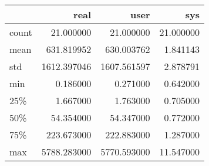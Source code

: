 \begin{tabular}{lrrr}
\toprule
{} &         real &         user &        sys \\
\midrule
count &    21.000000 &    21.000000 &  21.000000 \\
mean  &   631.819952 &   630.003762 &   1.841143 \\
std   &  1612.397046 &  1607.561597 &   2.878791 \\
min   &     0.186000 &     0.271000 &   0.642000 \\
25\%   &     1.667000 &     1.763000 &   0.705000 \\
50\%   &    54.354000 &    54.347000 &   0.772000 \\
75\%   &   223.673000 &   222.883000 &   1.287000 \\
max   &  5788.283000 &  5770.593000 &  11.547000 \\
\bottomrule
\end{tabular}

